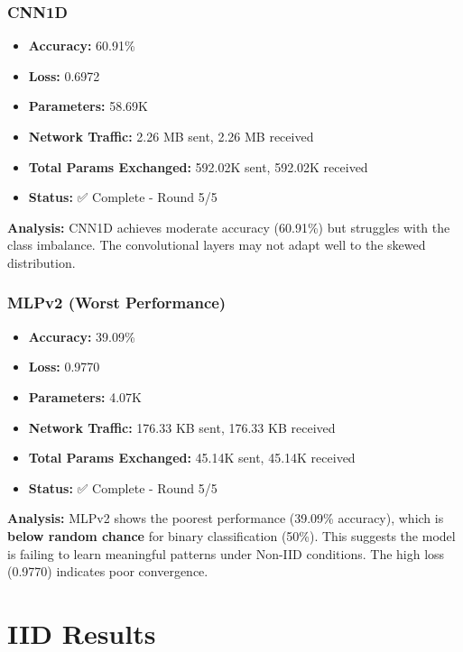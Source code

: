 \documentclass[12pt,a4paper]{article}
\begin{document}
\subsubsection{CNN1D}

\begin{itemize}
    \item \textbf{Accuracy:} 60.91\%
    \item \textbf{Loss:} 0.6972
    \item \textbf{Parameters:} 58.69K
    \item \textbf{Network Traffic:} 2.26 MB sent, 2.26 MB received
    \item \textbf{Total Params Exchanged:} 592.02K sent, 592.02K received
    \item \textbf{Status:} ✅ Complete - Round 5/5
\end{itemize}

\textbf{Analysis:} CNN1D achieves moderate accuracy (60.91\%) but struggles with the class imbalance. The convolutional layers may not adapt well to the skewed distribution.

\subsubsection{MLPv2 (Worst Performance)}

\begin{itemize}
    \item \textbf{Accuracy:} 39.09\%
    \item \textbf{Loss:} 0.9770
    \item \textbf{Parameters:} 4.07K
    \item \textbf{Network Traffic:} 176.33 KB sent, 176.33 KB received
    \item \textbf{Total Params Exchanged:} 45.14K sent, 45.14K received
    \item \textbf{Status:} ✅ Complete - Round 5/5
\end{itemize}

\textbf{Analysis:} MLPv2 shows the poorest performance (39.09\% accuracy), which is \textbf{below random chance} for binary classification (50\%). This suggests the model is failing to learn meaningful patterns under Non-IID conditions. The high loss (0.9770) indicates poor convergence.

\section{IID Results}
\end{document}
